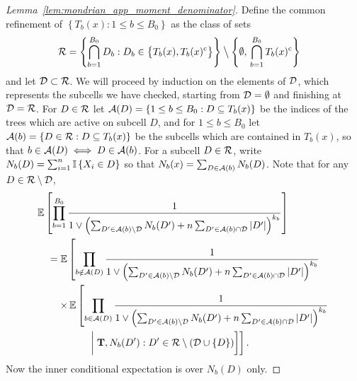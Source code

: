 \begin{proof}[Lemma~\ref{lem:mondrian_app_moment_denominator}]

  Define the common refinement of
  $\left\{ T_b(x) : 1 \leq b \leq {B_0} \right\}$ as
  the class of sets
  \begin{align*}
    \mathcal{R}
    &= \left\{ \bigcap_{b=1}^{B_0} D_b :
      D_b \in
      \big\{ T_b(x), T_b(x)^{\mathrm{c}} \big\}
    \right\}
    \mathbin{\big\backslash}
    \left\{
      \emptyset,\,
      \bigcap_{b=1}^{B_0}
      T_b(x)^{\mathrm{c}}
    \right\}
  \end{align*}
  and let $\mathcal{D} \subset \mathcal{R}$.
  We will proceed by induction on the elements of $\mathcal{D}$,
  which represents the subcells we have checked,
  starting from $\mathcal{D} = \emptyset$ and finishing at $\mathcal{D} = \mathcal{R}$.
  For $D \in \mathcal{R}$ let
  $\mathcal{A}(D) = \left\{ 1 \leq b \leq {B_0} : D \subseteq T_b(x) \right\}$
  be the indices of the trees which are active on subcell $D$,
  and for $1 \leq b \leq {B_0}$ let
  $\mathcal{A}(b) = \left\{ D \in \mathcal{R} : D \subseteq T_b(x) \right\}$
  be the subcells which are contained in $T_b(x)$,
  so that $b \in \mathcal{A}(D) \iff D \in \mathcal{A}(b)$.
  For a subcell $D \in \mathcal{R}$,
  write $N_b(D) = \sum_{i=1}^{n} \mathbb{I} \left\{ X_i \in D \right\}$
  so that $N_b(x) = \sum_{D \in \mathcal{A}(b)} N_b(D)$.
  Note that for any $D \in \mathcal{R} \setminus \mathcal{D}$,
  \begin{align*}
    &\mathbb{E} \left[
      \prod_{b=1}^{B_0}
      \frac{1}{
        1 \vee \left(
          \sum_{D' \in \mathcal{A}(b) \setminus \mathcal{D}}
          N_b(D')
          + n \sum_{D' \in \mathcal{A}(b) \cap \mathcal{D}}
          |D'|
        \right)^{k_b}
      }
    \right] \\
    &\quad=
    \mathbb{E} \left[
      \prod_{b \notin \mathcal{A}(D)}
      \frac{1}{
        1 \vee \left(
          \sum_{D' \in \mathcal{A}(b) \setminus \mathcal{D}}
          N_b(D')
          + n \sum_{D' \in \mathcal{A}(b) \cap \mathcal{D}}
          |D'|
        \right)^{k_b}
      } \right. \\
      &\left.
      \qquad
      \times\,\mathbb{E}\left[
        \prod_{b \in \mathcal{A}(D)}
        \frac{1}{
          1 \vee \left(
            \sum_{D' \in \mathcal{A}(b) \setminus \mathcal{D}}
            N_b(D')
            + n \sum_{D' \in \mathcal{A}(b) \cap \mathcal{D}}
            |D'|
          \right)^{k_b}
        } \right.\right. \\
        &\left.\left.
        \quad\qquad\qquad\biggm|
        \mathbf{T},
        N_b(D') : D' \in \mathcal{R}
        \setminus
        (\mathcal{D} \cup \{D\})
      \right]
    \right].
  \end{align*}
  Now the inner conditional expectation is over $N_b(D)$ only.

\end{proof}

